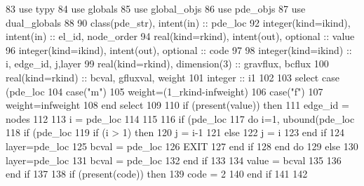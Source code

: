 \begin{DoxyCode}
83       \textcolor{keywordtype}{use }typy
84       \textcolor{keywordtype}{use }globals
85       \textcolor{keywordtype}{use }global_objs
86       \textcolor{keywordtype}{use }pde_objs
87       \textcolor{keywordtype}{use }dual_globals
88 
90       \textcolor{keywordtype}{class}(pde_str), \textcolor{keywordtype}{intent(in)} :: pde\_loc 
92       \textcolor{keywordtype}{integer(kind=ikind)}, \textcolor{keywordtype}{intent(in)}  :: el\_id, node\_order
94       \textcolor{keywordtype}{real(kind=rkind)}, \textcolor{keywordtype}{intent(out)}, \textcolor{keywordtype}{optional}    :: value
96       \textcolor{keywordtype}{integer(kind=ikind)}, \textcolor{keywordtype}{intent(out)}, \textcolor{keywordtype}{optional} :: code
97 
98       \textcolor{keywordtype}{integer(kind=ikind)} :: i, edge\_id, j,layer
99       \textcolor{keywordtype}{real(kind=rkind)}, \textcolor{keywordtype}{dimension(3)} :: gravflux, bcflux
100       \textcolor{keywordtype}{real(kind=rkind)} :: bcval, gfluxval, weight
101       \textcolor{keywordtype}{integer} :: i1
102       
103       \textcolor{keywordflow}{select case} (pde\_loc%
104         \textcolor{keywordflow}{case}(\textcolor{stringliteral}{"m"})
105           weight=(1\_rkind-infweight)
106         \textcolor{keywordflow}{case}(\textcolor{stringliteral}{"f"})
107           weight=infweight
108 \textcolor{keywordflow}{      end select}
109 
110       \textcolor{keywordflow}{if} (\textcolor{keyword}{present}(\textcolor{keywordtype}{value})) \textcolor{keywordflow}{then}
111         edge\_id = nodes%
112 
113         i = pde\_loc%
114         
115 
116         \textcolor{keywordflow}{if} (pde\_loc%
117           \textcolor{keywordflow}{do} i=1, ubound(pde\_loc%
118             \textcolor{keywordflow}{if} (pde\_loc%
119               \textcolor{keywordflow}{if} (i > 1) \textcolor{keywordflow}{then}
120                 j = i-1
121               \textcolor{keywordflow}{else}
122                 j = i
123 \textcolor{keywordflow}{              end if}
124               layer=pde\_loc%
125               bcval = pde\_loc%
126               \textcolor{keywordflow}{EXIT}
127 \textcolor{keywordflow}{            end if}
128 \textcolor{keywordflow}{          end do}
129         \textcolor{keywordflow}{else}
130           layer=pde\_loc%
131           bcval = pde\_loc%
132 \textcolor{keywordflow}{        end if}
133 
134         \textcolor{keywordtype}{value} = bcval
135 
136 \textcolor{keywordflow}{      end if}
137       
138       \textcolor{keywordflow}{if} (\textcolor{keyword}{present}(code)) \textcolor{keywordflow}{then}
139         code = 2
140 \textcolor{keywordflow}{      end if}
141 
142 
\end{DoxyCode}


